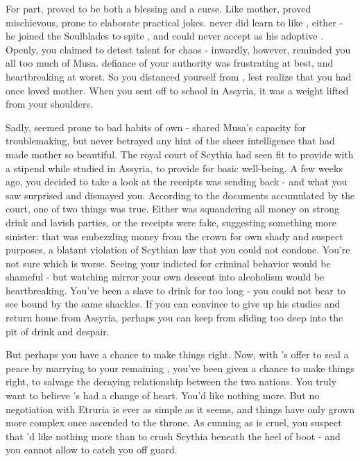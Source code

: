 \documentclass[char]{Kos}
\begin{document}
    For \cWard{\their} part, \cWard{} proved to be both a blessing and a curse. Like \cWard{\their} mother, \cWard{\they} proved mischievous, prone to elaborate practical jokes. \cWard{\They} never did learn to like \cScythiaQueen{}, either - he joined the Soulblades to spite \cScythiaQueen{\them}, and could never accept \cScythiaQueen{\them} as his adoptive \cScythiaQueen{\parent}. Openly, you claimed to detest \cWard{\their} talent for chaos - inwardly, however, \cWard{\they} reminded you all too much of Musa. \cWard{\Their} defiance of your authority was frustrating at best, and heartbreaking at worst. So you distanced yourself from \cWard{\them}, lest \cScythiaQueen{} realize that you had once loved \cWard{\their} mother. When you sent \cWard{} off to school in Assyria, it was a weight lifted from your shoulders.

    Sadly, \cWard{} seemed prone to bad habits of \cWard{\their} own - \cWard{\they} shared Musa's capacity for troublemaking, but never betrayed any hint of the sheer intelligence that had made \cWard{\their} mother so beautiful. The royal court of Scythia had seen fit to provide  with a stipend while \cWard{\they} studied in Assyria, to provide for \cWard{\their} basic well-being. A few weeks ago, you decided to take a look at the receipts \cWard{} was sending back - and what you saw surprised and dismayed you. According to the documents accumulated by the court, one of two things was true. Either \cWard{} was squandering all \cWard{\their} money on strong drink and lavish parties, or the receipts were fake, suggesting something more sinister: that \cWard{\they} was embezzling money from the crown for \cWard{\their} own shady and suspect purposes, a blatant violation of Scythian law that you could not condone. You're not sure which is worse. Seeing your \cWard{\offspring} indicted for criminal behavior would be shameful - but watching \cWard{\them} mirror your own descent into alcoholism would be heartbreaking. You've been a slave to drink for too long - you could not bear to see \cWard{\them} bound by the same shackles. If you can convince \cWard{\them} to give up his studies and return home from Assyria, perhaps you can keep \cWard{\them} from sliding too deep into the pit of drink and despair.

    But perhaps you have a chance to make things right. Now, with \cEtruriaKing{\Monarch} \cEtruriaKing{}'s offer to seal a peace by marrying \cEtruriaKing{\their} \cGroom{\offspring} \cGroom{} to your remaining \cBride{\offspring} \cBride{}, you've been given a chance to make things right, to salvage the decaying relationship between the two nations. You truly want to believe \cEtruriaKing{\they}'s had a change of heart. You'd like nothing more. But no negotiation with Etruria is ever as simple as it seems, and things have only grown more complex once \cEtruriaKing{} ascended to the throne. As cunning as \cEtruriaKing{\they} is cruel, you suspect that \cEtruriaKing{\they}'d like nothing more than to crush Scythia beneath the heel of \cEtruriaKing{\their} boot - and you cannot allow \cEtruriaKing{\them} to catch you off guard. 
\end{document}
